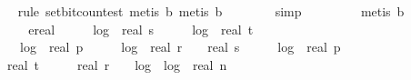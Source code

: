 \begin{isabellebody}
\ \ \ \ \ \ \isamarkupfalse%
\ {\isacharparenleft}{\kern0pt}rule\ set{\isacharunderscore}{\kern0pt}bit{\isacharunderscore}{\kern0pt}count{\isacharunderscore}{\kern0pt}est{\isacharcomma}{\kern0pt}\ metis\ b{\isacharunderscore}{\kern0pt}{}{\isacharcomma}{\kern0pt}\ metis\ b{\isacharunderscore}{\kern0pt}{}{\isacharparenright}{\kern0pt}\isanewline
\ \ \ \ \ \ \isamarkupfalse%
\ simp\ \isanewline
\ \ \ \ \ \ \isamarkupfalse%
\ {\isacharparenleft}{\kern0pt}metis\ b{\isacharunderscore}{\kern0pt}{}{\isacharunderscore}{\kern0pt}{}{\isacharparenright}{\kern0pt}\isanewline
\ \ \ \ \isamarkupfalse%
\ \isamarkupfalse%
\ {\isachardoublequoteopen}{\isachardot}{\kern0pt}{\isachardot}{\kern0pt}{\isachardot}{\kern0pt}\ {\isacharequal}{\kern0pt}\ ereal\ {\isacharparenleft}{\kern0pt}\ {}\ {\isacharplus}{\kern0pt}\ {}\ {\isacharasterisk}{\kern0pt}\ log\ {}\ {\isacharparenleft}{\kern0pt}real\ s\ {\isacharplus}{\kern0pt}\ {}{\isacharparenright}{\kern0pt}\ {\isacharplus}{\kern0pt}\ {}\ {\isacharasterisk}{\kern0pt}\ log\ {}\ {\isacharparenleft}{\kern0pt}real\ t\ {\isacharplus}{\kern0pt}\ {}{\isacharparenright}{\kern0pt}\ {\isacharplus}{\kern0pt}\ \isanewline
\ \ \ \ \ \ {}\ {\isacharasterisk}{\kern0pt}\ log\ {}\ {\isacharparenleft}{\kern0pt}real\ p\ {\isacharplus}{\kern0pt}\ {}{\isacharparenright}{\kern0pt}\ {\isacharplus}{\kern0pt}\ {}\ {\isacharasterisk}{\kern0pt}\ log\ {}\ {\isacharparenleft}{\kern0pt}real\ r\ {\isacharplus}{\kern0pt}\ {}{\isacharparenright}{\kern0pt}\ {\isacharplus}{\kern0pt}\ real\ s\ {\isacharasterisk}{\kern0pt}\ {\isacharparenleft}{\kern0pt}{}\ {\isacharplus}{\kern0pt}\ {}\ {\isacharasterisk}{\kern0pt}\ log\ {}\ {\isacharparenleft}{\kern0pt}real\ p{\isacharparenright}{\kern0pt}\ {\isacharplus}{\kern0pt}\ \isanewline
\ \ \ \ \ \ real\ t\ {\isacharasterisk}{\kern0pt}\ {\isacharparenleft}{\kern0pt}{}{}\ {\isacharplus}{\kern0pt}\ {\isacharparenleft}{\kern0pt}{}\ {\isacharasterisk}{\kern0pt}\ real\ r\ {\isacharplus}{\kern0pt}\ {}\ {\isacharasterisk}{\kern0pt}\ log\ {}\ {\isacharparenleft}{\kern0pt}log\ {}\ {\isacharparenleft}{\kern0pt}real\ n\ {\isacharplus}{\kern0pt}\ {}{\isacharparenright}{\kern0pt}{\isacharparenright}{\kern0pt}{\isacharparenright}{\kern0pt}{\isacharparenright}{\kern0pt}{\isacharparenright}{\kern0pt}{\isacharparenright}{\kern0pt}{\isachardoublequoteclose}\isanewline

\end{isabellebody}
